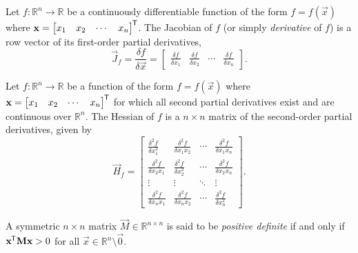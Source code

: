 \begin{definition}[Jacobian]
    Let $f: \mathbb{R}^n \rightarrow \mathbb{R}$ be a continuously differentiable function of the form
    $f=f\left(\vec{x}\right)$
    where
    $\mathbf{x} = \begin{bmatrix}
        x_1 & x_2 & \cdots & x_n
    \end{bmatrix}^{\mkern-1.5mu\mathsf{T}}$.
    The Jacobian of $f$ (or simply \textit{derivative} of $f$) is a row vector of its first-order partial derivatives,
    \begin{equation*}
        \vec{J}_f
        = \frac{\delta f}{\delta \vec{x}}
        = \begin{bmatrix}
            \frac{\delta f}{\delta x_1} &
            \frac{\delta f}{\delta x_2} &
            \cdots &
            \frac{\delta f}{\delta x_n}
        \end{bmatrix}.
    \end{equation*}
\end{definition}
\begin{definition}[Hessian]
    Let $f: \mathbb{R}^n \rightarrow \mathbb{R}$ be a function of the form
    $f=f\left(\vec{x}\right)$
    where
    $\mathbf{x} = \begin{bmatrix}
        x_1 & x_2 & \cdots & x_n
    \end{bmatrix}^{\mkern-1.5mu\mathsf{T}}$
    for which all second partial derivatives exist and are continuous over $\mathbb{R}^n$.
    The Hessian of $f$ is a $n\times n$ matrix of the second-order partial derivatives, given by
    \begin{equation*}
        \vec{H}_f = \begin{bmatrix}
            \frac{\delta^2 f}{\delta x_1^2} &
            \frac{\delta^2 f}{\delta x_1 x_2} &
            \cdots &
            \frac{\delta^2 f}{\delta x_1 x_n} \\
            \frac{\delta^2 f}{\delta x_2 x_1} &
            \frac{\delta^2 f}{\delta x_2^2} &
            \cdots &
            \frac{\delta^2 f}{\delta x_2 x_n} \\
            \vdots & \vdots & \ddots & \vdots \\
            \frac{\delta^2 f}{\delta x_n x_1} &
            \frac{\delta^2 f}{\delta x_n x_2} &
            \cdots &
            \frac{\delta^2 f}{\delta x_n^2}
        \end{bmatrix}.
    \end{equation*}
\end{definition}
\begin{definition}
    \label{def:positive_definite}
    A symmetric $n\times n$ matrix $\vec{M} \in \mathbb{R}^{n\times n}$ is said to be \textit{positive definite} if and only if
    $\mathbf{x}^{\mkern-1.5mu\mathsf{T}} \mathbf{M} \mathbf{x} > 0$
    for all $\vec{x} \in \mathbb{R}^n \setminus \vec{0}$.
\end{definition}
